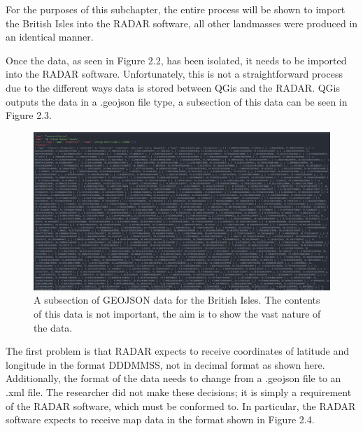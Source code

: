 \documentclass[stu, a4paper, 12pt, floatsintext]{apa7}
\numberwithin{figure}{section}
\numberwithin{table}{section}
\numberwithin{equation}{section}
\begin{document}
For the purposes of this subchapter, the entire process will be shown to import the British Isles into the RADAR software, all other landmasses were produced in an identical manner. 

Once the data, as seen in Figure 2.2, has been isolated, it needs to be imported into the RADAR software. Unfortunately, this is not a straightforward process due to the different ways data is stored between QGis and the RADAR. QGis outputs the data in a .geojson file type, a subsection of this data can be seen in Figure 2.3. 

\begin{figure}[H]
    \caption{A subsection of GEOJSON data for the British Isles. The contents of this data is not important, the aim is to show the vast nature of the data.}
    \label{fig:2.3}
    \centering
    \includegraphics[width=1.1\textwidth]{pictures/Figure 2.3 FYP.jpg}    
\end{figure}

The first problem is that RADAR expects to receive coordinates of latitude and longitude in the format DDDMMSS, not in decimal format as shown here. Additionally, the format of the data needs to change from a .geojson file to an .xml file. The researcher did not make these decisions; it is simply a requirement of the RADAR software, which must be conformed to. In particular, the RADAR software expects to receive map data in the format shown in Figure 2.4.
\end{document}
